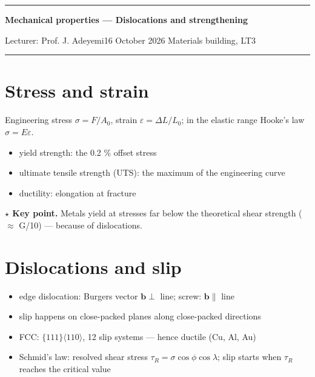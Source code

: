 \documentclass[11pt]{article}
\newcommand\knotetime[1]{\leavevmode\llap{\color{knotemuted}\scriptsize #1\hspace{1em}}}
\newcommand\knotekey[2][]{\par\noindent#1\colorbox{knotekey!12}{\parbox{\dimexpr\linewidth-2\fboxsep}{%
  \textbf{\color{knotekey}$\star$ Key point.} #2}}\par}
\newenvironment{knotechunk}{}{}
\begin{document}
\begin{knotechunk}
{\color{knoteaccent}\rule{\linewidth}{1.5pt}}\par
{\LARGE\bfseries Mechanical properties — Dislocations and strengthening}\par
{\large Lecturer: Prof. J. Adeyemi}\hfill{\color{knotemuted}16 October 2026 \textperiodcentered{} Materials building, LT3}\par
{\color{knoteaccent}\rule{\linewidth}{0.6pt}}\par

\section{Stress and strain}

\knotetime{01:25}Engineering stress $\sigma = F/A_0$, strain $\varepsilon = \Delta L/L_0$; in the elastic range Hooke's law $\sigma = E\varepsilon$.

\begin{itemize}\setlength{\itemsep}{0pt}\setlength{\parskip}{0pt}
  \item yield strength: the 0.2 \% offset stress
  \item ultimate tensile strength (UTS): the maximum of the engineering curve
  \item ductility: elongation at fracture
\end{itemize}

\knotekey[\knotetime{03:05}]{Metals yield at stresses far below the theoretical shear strength (\ensuremath{\approx} G/10) — because of dislocations.}
\end{knotechunk}

\begin{knotechunk}
\section{Dislocations and slip}

\begin{itemize}\setlength{\itemsep}{0pt}\setlength{\parskip}{0pt}
  \item edge dislocation: Burgers vector $\mathbf{b} \perp$ line; screw: $\mathbf{b} \parallel$ line
  \item slip happens on close-packed planes along close-packed directions
  \item FCC: $\{111\}\langle 110\rangle$, 12 slip systems — hence ductile (Cu, Al, Au)
  \item Schmid's law: resolved shear stress $\tau_R = \sigma\cos\phi\cos\lambda$; slip starts when $\tau_R$ reaches the critical value
\end{itemize}
\end{knotechunk}
\end{document}

